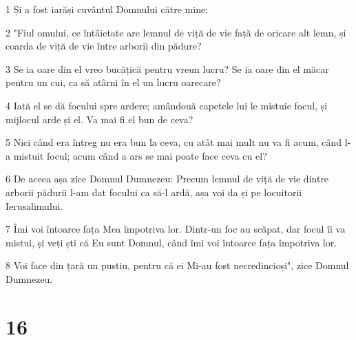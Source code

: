 \par 1 Și a fost iarăși cuvântul Domnului către mine:
\par 2 "Fiul omului, ce întâietate are lemnul de viță de vie față de oricare alt lemn, și coarda de viță de vie între arborii din pădure?
\par 3 Se ia oare din el vreo bucățică pentru vreun lucru? Se ia oare din el măcar pentru un cui, ca să atârni în el un lucru oarecare?
\par 4 Iată el se dă focului spre ardere; amândouă capetele lui le mistuie focul, și mijlocul arde și el. Va mai fi el bun de ceva?
\par 5 Nici când era întreg nu era bun la ceva, cu atât mai mult nu va fi acum, când l-a mistuit focul; acum când a ars se mai poate face ceva cu el?
\par 6 De aceea așa zice Domnul Dumnezeu: Precum lemnul de viță de vie dintre arborii pădurii l-am dat focului ca să-l ardă, așa voi da și pe locuitorii Ierusalimului.
\par 7 Îmi voi întoarce fața Mea împotriva lor. Dintr-un foc au scăpat, dar focul îi va mistui, și veți ști că Eu sunt Domnul, când îmi voi întoarce fața împotriva lor.
\par 8 Voi face din țară un pustiu, pentru că ei Mi-au fost necredincioși", zice Domnul Dumnezeu.

\chapter{16}

